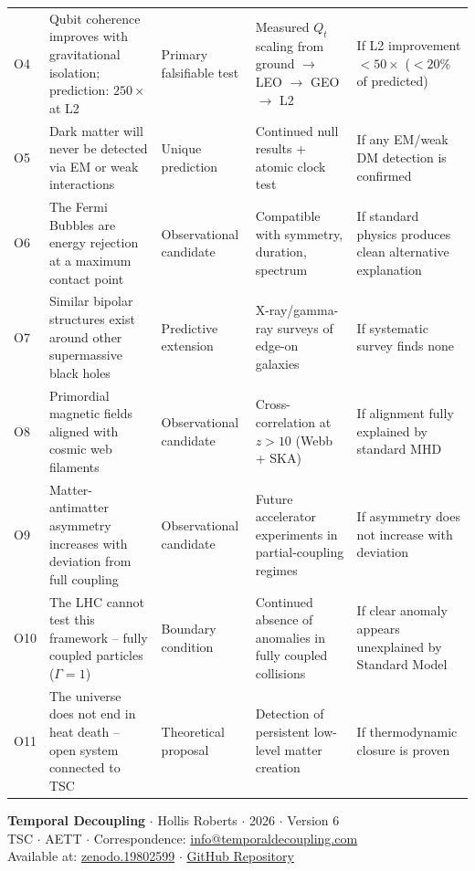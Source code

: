 \documentclass[11pt,a4paper]{article}
\begin{document}
\begin{longtable}{@{} l >{\RaggedRight\arraybackslash}p{4.1cm} >{\RaggedRight\arraybackslash}p{2.0cm} >{\RaggedRight\arraybackslash}p{2.6cm} >{\RaggedRight\arraybackslash}p{3.0cm} @{}}
O4 & Qubit coherence improves with gravitational isolation; prediction: $250\times$ at L2 & Primary falsifiable test & Measured $Q_t$ scaling from ground $\to$ LEO $\to$ GEO $\to$ L2 & If L2 improvement $< 50\times$ ($< 20\%$ of predicted) \\
O5 & Dark matter will never be detected via EM or weak interactions & Unique prediction & Continued null results + atomic clock test & If any EM/weak DM detection is confirmed \\
O6 & The Fermi Bubbles are energy rejection at a maximum contact point & Observational candidate & Compatible with symmetry, duration, spectrum & If standard physics produces clean alternative explanation \\
O7 & Similar bipolar structures exist around other supermassive black holes & Predictive extension & X-ray/gamma-ray surveys of edge-on galaxies & If systematic survey finds none \\
O8 & Primordial magnetic fields aligned with cosmic web filaments & Observational candidate & Cross-correlation at $z > 10$ (Webb + SKA) & If alignment fully explained by standard MHD \\
O9 & Matter-antimatter asymmetry increases with deviation from full coupling & Observational candidate & Future accelerator experiments in partial-coupling regimes & If asymmetry does not increase with deviation \\
O10 & The LHC cannot test this framework -- fully coupled particles ($\Gamma=1$) & Boundary condition & Continued absence of anomalies in fully coupled collisions & If clear anomaly appears unexplained by Standard Model \\
O11 & The universe does not end in heat death -- open system connected to TSC & Theoretical proposal & Detection of persistent low-level matter creation & If thermodynamic closure is proven \\
\end{longtable}
\normalsize

\vspace{1em}
\begin{center}
\textbf{Temporal Decoupling} $\cdot$ Hollis Roberts $\cdot$ 2026 $\cdot$ Version 6 \\
TSC $\cdot$ AETT $\cdot$ Correspondence: \url{info@temporaldecoupling.com} \\
Available at: \href{https://doi.org/10.5281/zenodo.19802599}{zenodo.19802599} $\cdot$ \href{https://github.com/Hollis-Roberts/aett-tsc-roberts-vacuum-model/tree/main}{GitHub Repository}
\end{center}
\end{document}
